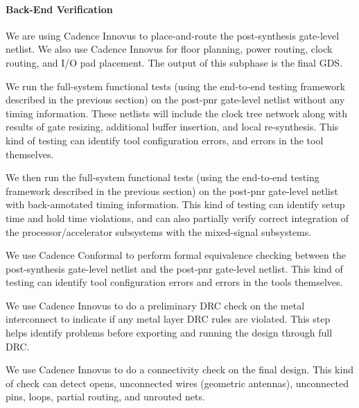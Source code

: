 \smallskip
\paragraph{Back-End Verification}
We are using Cadence Innovus to place-and-route the post-synthesis
gate-level netlist. We also use Cadence Innovus for floor planning, power
routing, clock routing, and I/O pad placement. The output of this
subphase is the final GDS.

\smallskip
\begin{cbxlist}{1.5em}{0em}{0.5em}

  \item {} We run the full-system
     functional tests (using the end-to-end testing framework described
     in the previous section) on the post-pnr gate-level netlist without
     any timing information. These netlists will include the clock tree
     network along with results of gate resizing, additional buffer
     insertion, and local re-synthesis. This kind of testing can identify
     tool configuration errors, and errors in the tool themselves.

  \item {} We then run the
     full-system functional tests (using the end-to-end testing framework
     described in the previous section) on the post-pnr gate-level
     netlist with back-annotated timing information. This kind of testing
     can identify setup time and hold time violations, and can also
     partially verify correct integration of the processor/accelerator
     subsystems with the mixed-signal subsystems.

  \item {} We use Cadence Conformal to
     perform formal equivalence checking between the post-synthesis
     gate-level netlist and the post-pnr gate-level netlist. This kind of
     testing can identify tool configuration errors and errors in the
     tools themselves.

  \item {} We use Cadence Innovus to do
     a preliminary DRC check on the metal interconnect to indicate if any
     metal layer DRC rules are violated. This step helps identify
     problems before exporting and running the design through full DRC.

  \item {} We use Cadence Innovus to do a
     connectivity check on the final design. This kind of check can
     detect opens, unconnected wires (geometric antennas), unconnected
     pins, loops, partial routing, and unrouted nets.


\end{cbxlist}
